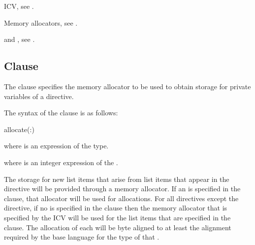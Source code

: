 \begin{crossrefs}
\item {} ICV, see .

\item Memory allocators, see .

\item {} and , 
see .
\end{crossrefs}

\subsection{ Clause}
\label{subsec:allocate Clause}
\summary
The  clause specifies the memory allocator to be used to 
obtain storage for private variables of a directive.

\syntax

The syntax of the  clause is as follows:

\begin{ompSyntax}
allocate(\plc{[allocator}:\plc{] list})
\end{ompSyntax}

\begin{ccppspecific}
where  is an expression of the  type.
\end{ccppspecific}

\begin{fortranspecific}
where  is an integer expression of the  
.
\end{fortranspecific}

\descr

The storage for new list items that arise from list items that appear in the 
directive will be provided through a memory allocator. If an  
is specified in the clause, that allocator will be used for allocations. For 
all directives except the  directive, if no  is 
specified in the clause then the memory allocator that is specified by the 
 ICV will be used for the list items that are specified 
in the  clause. The allocation of each  
will be byte aligned to at least the alignment required by the
base language for the type of that .

